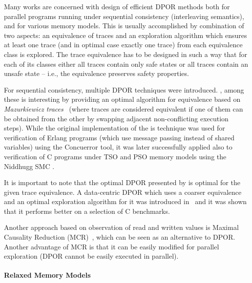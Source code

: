 Many works are concerned with design of efficient DPOR methods both for
parallel programs running under sequential consistency (interleaving
semantics), and for various memory models.
This is usually accomplished by combination of two aspects: an equivalence of
traces and an exploration algorithm which ensures at least one trace (and in
optimal case exactly one trace) from each equivalence class is explored.
The trace equivalence has to be designed in such a way that for each of its
classes either all traces contain only safe states or all traces contain an
unsafe state -- i.e., the equivalence preserves safety properties.

For sequential consistency, multiple DPOR techniques were introduced.
 \cite{TODO,TODO}, among these \cite{Abdulla2014} is interesting by providing an optimal algorithm for equivalence based on \emph{Mazurkiewicz traces}~\cite{Mazurkiewicz1987} (where traces are considered equivalent if one of them can be obtained from the other by swapping adjacent non-conflicting execution steps).
While the original implementation of the is technique was used for verification of Erlang programs (which use message passing instead of shared variables) using the Concuerror tool, it was later successfully applied also to verification of C programs under TSO and PSO memory models using the Niddhugg SMC \cite{Abdulla2017tso}.

It is important to note that the optimal DPOR presented by \cite{Abdulla2014}
is optimal for the given trace equivalence.
A data-centric DPOR which uses a coarser equivalence and an optimal
exploration algorithm for it was introduced in~\cite{Chalupa2017} and it was
shown that it performs better on a selection of C benchmarks.

Another approach based on observation of read and written values is Maximal
Causality Reduction (MCR)~\cite{Huang2015}, which can be seen as an alternative
to DPOR.
Another advantage of MCR is that it can be easily modified for parallel
exploration (DPOR cannot be easily executed in parallel).


\paragraph{Relaxed Memory Models}


